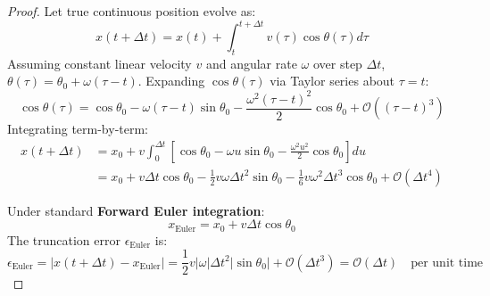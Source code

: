 \documentclass[11pt, a4paper]{article}
\begin{document}
\begin{proof}
Let true continuous position evolve as:
\begin{equation}
    x(t + \Delta t) = x(t) + \int_t^{t+\Delta t} v(\tau) \cos\theta(\tau) d\tau
\end{equation}
Assuming constant linear velocity $v$ and angular rate $\omega$ over step $\Delta t$, $\theta(\tau) = \theta_0 + \omega (\tau - t)$. Expanding $\cos\theta(\tau)$ via Taylor series about $\tau = t$:
\begin{equation}
    \cos\theta(\tau) = \cos\theta_0 - \omega (\tau - t) \sin\theta_0 - \frac{\omega^2 (\tau - t)^2}{2} \cos\theta_0 + \mathcal{O}((\tau - t)^3)
\end{equation}
Integrating term-by-term:
\begin{align}
    x(t + \Delta t) &= x_0 + v \int_0^{\Delta t} \left[ \cos\theta_0 - \omega u \sin\theta_0 - \frac{\omega^2 u^2}{2} \cos\theta_0 \right] du \\
    &= x_0 + v \Delta t \cos\theta_0 - \frac{1}{2} v \omega \Delta t^2 \sin\theta_0 - \frac{1}{6} v \omega^2 \Delta t^3 \cos\theta_0 + \mathcal{O}(\Delta t^4)
\end{align}

Under standard \textbf{Forward Euler integration}:
\begin{equation}
    x_{\text{Euler}} = x_0 + v \Delta t \cos\theta_0
\end{equation}
The truncation error $\epsilon_{\text{Euler}}$ is:
\begin{equation}
    \epsilon_{\text{Euler}} = |x(t + \Delta t) - x_{\text{Euler}}| = \frac{1}{2} v |\omega| \Delta t^2 |\sin\theta_0| + \mathcal{O}(\Delta t^3) = \mathcal{O}(\Delta t) \quad \text{per unit time}
\end{equation}


\end{proof}
\end{document}
